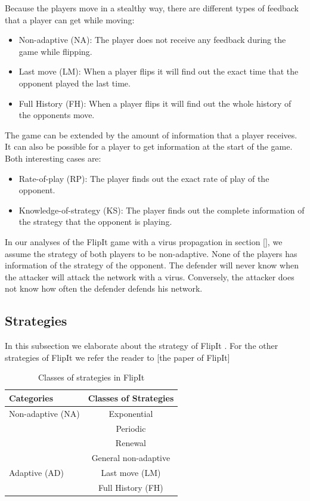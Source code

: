 Because the players move in a stealthy way, there are different types of feedback that a player can get while moving:
\begin{itemize}
\item Non-adaptive (NA): The player does not receive any feedback during the game while flipping.
\item Last move (LM): When a player flips it will find out the exact time that the opponent played the last time.
\item Full History (FH): When a player flips it will find out the whole history of the opponents move.
\end{itemize}
The game can be extended by the amount of information that a player receives. It can also be possible for a player to get information at the start of the game. Both interesting cases are:
\begin{itemize}
\item Rate-of-play (RP): The player finds out the exact rate of play of the opponent.
\item Knowledge-of-strategy (KS): The player finds out the complete information of the strategy that the opponent is playing.
\end{itemize}

In our analyses of the FlipIt game with a virus propagation in section [], we assume the strategy of both players to be non-adaptive. None of the players has information of the strategy of the opponent. The defender will never know when the attacker will attack the network with a virus. Conversely, the attacker does not know how often the defender defends his network. 


\subsection{Strategies}
 
 In this subsection we elaborate about the strategy of FlipIt . For the other strategies of FlipIt we refer the reader to [the paper of FlipIt]
 \begin{table}
 \centering
 \begin{tabular}{ l | c  }
  \textbf{Categories} & \textbf{Classes of Strategies} \\
  \hline Non-adaptive (NA) & Exponential \\
  & Periodic \\
  & Renewal \\
  & General non-adaptive \\
  \hline Adaptive (AD) & Last move (LM) \\
  & Full History (FH) \\  
\end{tabular}
 \caption{Classes of strategies in FlipIt}
 \label{table:Strategies}
 \end{table}

